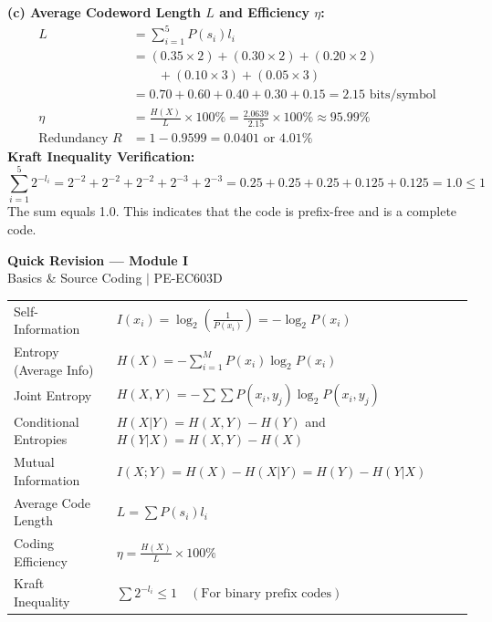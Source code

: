 \documentclass[12pt,a4paper]{article}
\renewcommand{\arraystretch}{1.45}
\begin{document}
\begin{tcolorbox}[examplebox, title={Worked Example: Shannon-Fano Coding}]
\textbf{(c) Average Codeword Length $L$ and Efficiency $\eta$:}
\begin{align*}
  L &= \sum_{i=1}^5 P(s_i) l_i \\
    &= (0.35 \times 2) + (0.30 \times 2) + (0.20 \times 2) \\
    &\qquad + (0.10 \times 3) + (0.05 \times 3) \\
  &= 0.70 + 0.60 + 0.40 + 0.30 + 0.15 = 2.15 \text{ bits/symbol} \\[4pt]
  \eta &= \frac{H(X)}{L} \times 100\% = \frac{2.0639}{2.15} \times 100\% \approx 95.99\% \\[4pt]
  \text{Redundancy } R &= 1 - 0.9599 = 0.0401 \text{ or } 4.01\%
\end{align*}
\textbf{Kraft Inequality Verification:}
\begin{equation*}
  \sum_{i=1}^5 2^{-l_i} = 2^{-2} + 2^{-2} + 2^{-2} + 2^{-3} + 2^{-3} = 0.25 + 0.25 + 0.25 + 0.125 + 0.125 = 1.0 \le 1
\end{equation*}
The sum equals 1.0. This indicates that the code is prefix-free and is a complete code.
\end{tcolorbox}

\newpage
\begin{center}
  {\large\bfseries\color{myred} Quick Revision --- Module I}\\[3pt]
  {\small\color{mydark} Basics \& Source Coding $|$ PE-EC603D}
\end{center}
\noindent{\color{myred}\rule{\linewidth}{1.2pt}}
\vspace{4pt}

\begin{tcolorbox}[formulabox, title={\textbf{Key Formulas at a Glance}}]
\renewcommand{\arraystretch}{1.3}
\begin{tabularx}{\linewidth}{B{4.5cm} X}
Self-Information        & $I(x_i) = \log_2 \left( \frac{1}{P(x_i)} \right) = -\log_2 P(x_i)$ \\[4pt]
Entropy (Average Info)   & $H(X) = -\sum_{i=1}^M P(x_i) \log_2 P(x_i)$ \\[4pt]
Joint Entropy           & $H(X, Y) = -\sum \sum P(x_i, y_j) \log_2 P(x_i, y_j)$ \\[4pt]
Conditional Entropies   & $H(X|Y) = H(X, Y) - H(Y)$ \quad and \quad $H(Y|X) = H(X, Y) - H(X)$ \\[4pt]
Mutual Information      & $I(X; Y) = H(X) - H(X|Y) = H(Y) - H(Y|X)$ \\[4pt]
Average Code Length     & $L = \sum P(s_i) l_i$ \\[4pt]
Coding Efficiency       & $\eta = \frac{H(X)}{L} \times 100\%$ \\[4pt]
Kraft Inequality        & $\sum 2^{-l_i} \le 1 \quad (\text{For binary prefix codes})$
\end{tabularx}
\end{tcolorbox}
\end{document}

